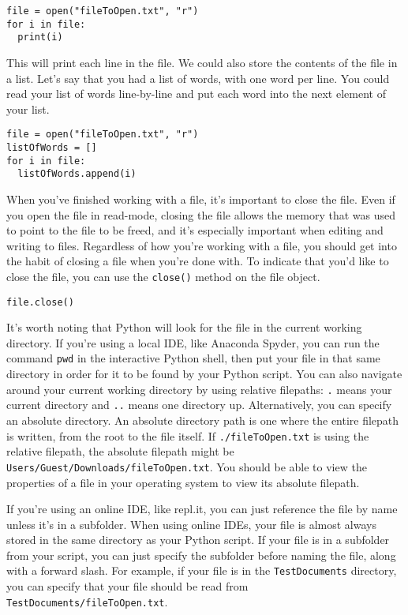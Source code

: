 \begin{lstlisting}[style=pippython]
file = open("fileToOpen.txt", "r")
for i in file:
  print(i)
\end{lstlisting}
This will print each line in the file. We could also store the contents of the file in a list. Let's say that you had a list of words, with one word per line. You could read your list of words line-by-line and put each word into the next element of your list.\par
\begin{lstlisting}[style=pippython]
file = open("fileToOpen.txt", "r")
listOfWords = []
for i in file:
  listOfWords.append(i)
\end{lstlisting}
When you've finished working with a file, it's important to close the file. Even if you open the file in read-mode, closing the file allows the memory that was used to point to the file to be freed, and it's especially important when editing and writing to files. Regardless of how you're working with a file, you should get into the habit of closing a file when you're done with. To indicate that you'd like to close the file, you can use the \verb|close()| method on the file object.
\begin{lstlisting}[style=pippython]
file.close()
\end{lstlisting}
It's worth noting that Python will look for the file in the current working directory. If you're using a local IDE, like Anaconda Spyder, you can run the command \verb|pwd| in the interactive Python shell, then put your file in that same directory in order for it to be found by your Python script. You can also navigate around your current working directory by using relative filepaths: \verb|.| means your current directory and \verb|..| means one directory up. Alternatively, you can specify an absolute directory. An absolute directory path is one where the entire filepath is written, from the root to the file itself. If \verb|./fileToOpen.txt| is using the relative filepath, the absolute filepath might be \verb|Users/Guest/Downloads/fileToOpen.txt|. You should be able to view the properties of a file in your operating system to view its absolute filepath.\par
If you're using an online IDE, like repl.it, you can just reference the file by name unless it's in a subfolder. When using online IDEs, your file is almost always stored in the same directory as your Python script. If your file is in a subfolder from your script, you can just specify the subfolder before naming the file, along with a forward slash. For example, if your file is in the \verb|TestDocuments| directory, you can specify that your file should be read from \verb|TestDocuments/fileToOpen.txt|.\par
